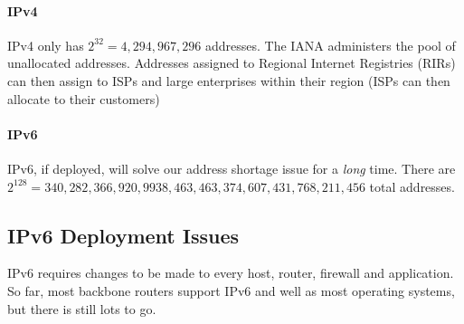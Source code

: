 \paragraph{IPv4}\label{par:ipv4}

IPv4 only has \(2^{32}=4,294,967,296\) addresses.
The IANA administers the pool of unallocated addresses.
Addresses assigned to Regional Internet Registries (RIRs) can then assign to ISPs and large enterprises within their region (ISPs can then allocate to their customers)

\paragraph{IPv6}\label{par:ipv6}

IPv6, if deployed, will solve our address shortage issue for a \emph{long} time.
There are \(2^{128}=340,282,366,920,9938,463,463,374,607,431,768,211,456\) total addresses.

\subsection{IPv6 Deployment Issues}\label{sub:ipv6_deployment_issues}

IPv6 requires changes to be made to every host, router, firewall and application.
So far, most backbone routers support IPv6 and well as most operating systems, but there is still lots to go.
